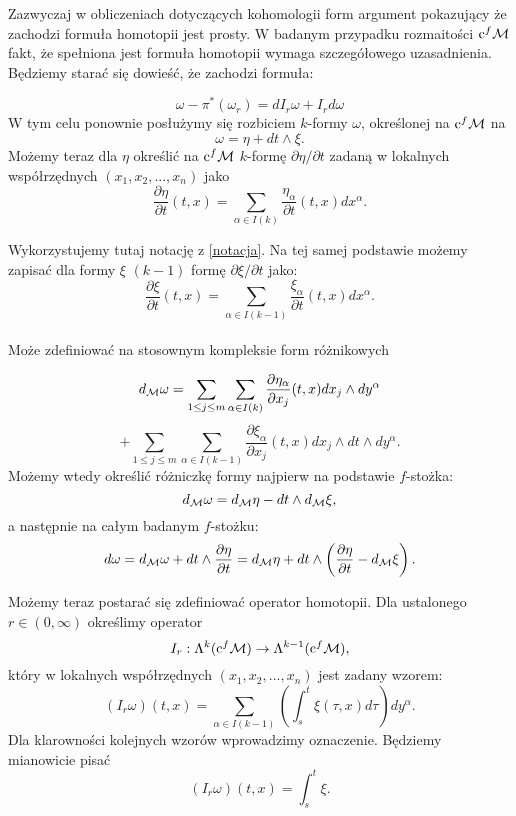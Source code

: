 \documentclass[licencjacka]{pracamgr}
\theoremstyle{definition}
\theoremstyle{definition}
\theoremstyle{plain}
\theoremstyle{plain}
\def\cfm{\ensuremath\mathrm{c}^f\mathcal{M}}
\def\M{\ensuremath\mathcal{M}}
\begin{document}
Zazwyczaj w obliczeniach dotyczących kohomologii form argument pokazujący
że zachodzi formuła homotopii jest prosty. %
W badanym przypadku rozmaitości $\cfm$ fakt, że spełniona jest formuła homotopii
wymaga szczegółowego uzasadnienia. \\


Będziemy starać się dowieść, że zachodzi formuła:

\[
    \omega - \pi^\ast(\omega_r) = dI_r \omega + I_r d\omega
\]
W tym celu ponownie posłużymy się rozbiciem $k$-formy $\omega$, określonej na
$\cfm$ na
\[
    \omega = \eta + dt \wedge \xi.
\] 
Możemy teraz dla $\eta$ określić na $\cfm$ $k$-formę $\partial \eta / \partial
t$ zadaną w lokalnych współrzędnych $(x_1, x_2, ..., x_n)$ jako
\[
    \frac{\partial \eta}{\partial t} (t, x) =
    \sum_{\alpha \in I(k)} \frac{\eta_\alpha}{\partial t}(t, x) dx^\alpha.
\]

Wykorzystujemy tutaj notację z \ref{notacja}. Na tej samej podstawie możemy 
zapisać dla formy $\xi$ $(k-1)$ formę $\partial \xi / \partial t$ jako:
\[
    \frac{\partial \xi}{\partial t} (t, x) =
    \sum_{\alpha \in I(k-1)} \frac{\xi_\alpha}{\partial t}(t, x) dx^\alpha. 
\] \\

Może zdefiniować na stosownym
kompleksie form różnikowych

\[
    d_\M \omega =  
    \sum_{1 \leq j \leq m} \sum_{\alpha \in I(k)}
    \frac{\partial \eta_\alpha}{\partial x_j}(t, x) dx_j \wedge dy^\alpha
\]
\[
    + \sum_{1 \leq j \leq m} \sum_{\alpha \in I(k-1)}
    \frac{\partial \xi_\alpha}{\partial x_j}(t, x) dx_j \wedge dt \wedge dy^\alpha.
\]
Możemy wtedy określić różniczkę formy najpierw na podstawie $f$-stożka:
\[
    d_\M \omega = d_\M \eta - dt \wedge d_\M \xi,
\]
a następnie na całym badanym $f$-stożku:
\[
    d \omega = 
    d_\M \omega + dt \wedge \frac{\partial \eta}{\partial t} = 
    d_\M \eta + dt \wedge \left( 
        \frac{\partial \eta}{\partial t} - d_\M \xi
    \right). \\
\]

Możemy teraz postarać się zdefiniować operator homotopii.
Dla ustalonego $r \in (0, \infty)$ określimy operator
\[
    I_r: \Lambda^k(\cfm) \rightarrow \Lambda^{k-1}(\cfm),
\]
który w lokalnych współrzędnych $(x_1, x_2, ..., x_n)$ jest zadany wzorem:
\[
    (I_r \omega)(t, x) = \sum_{\alpha \in I(k-1)}
      \left(
          \int_s^t \xi(\tau, x) d\tau 
      \right) dy^\alpha.
\] 
Dla klarowności kolejnych wzorów wprowadzimy oznaczenie. Będziemy mianowicie pisać
\[
    (I_r \omega)(t, x) = \int_s^t \xi.
\] \\
\end{document}
